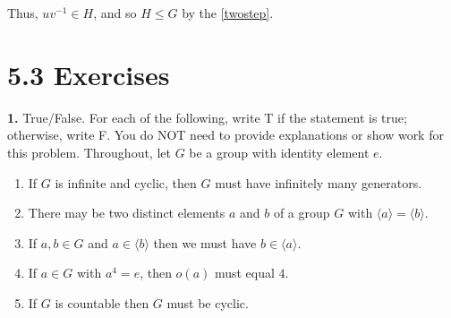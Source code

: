 \documentclass[10pt,]{book}
\theoremstyle{plain}
\theoremstyle{definition}
\theoremstyle{definition}
\theoremstyle{definition}
\theoremstyle{definition}
\numberwithin{equation}{section}
\begin{document}
\par

      Thus, \(uv^{-1}\in H\), and so \(H \leq G\) by the \hyperref[twostep]{\ref{twostep}}.
\par\smallskip
\section*{5.3 Exercises}
\noindent\textbf{1.}\quad{}
        True/False. For each of the following, write T if the statement is
        true; otherwise, write F. You do NOT need to provide explanations or show work for this problem. Throughout, let \(G\) be a group with identity element \(e\).
        \leavevmode%
\begin{enumerate}[label=(\alph*)]
\item\hypertarget{li-263}{}
              If \(G\) is infinite and cyclic, then \(G\) must have infinitely many generators.
\item\hypertarget{li-264}{}
              There may be two distinct elements \(a\) and \(b\) of a group \(G\) with \(\langle a\rangle =\langle b\rangle\).
\item\hypertarget{li-265}{}
              If \(a,b\in G\) and \(a\in \langle b\rangle\) then we must have \(b\in \langle a\rangle\).
\item\hypertarget{li-266}{}
              If \(a\in G\) with \(a^4=e\), then \(o(a)\) must equal \(4\).
\item\hypertarget{li-267}{}
              If \(G\) is countable then \(G\) must be cyclic.
\end{enumerate}
\end{document}
